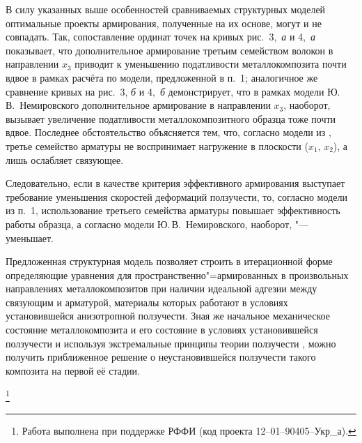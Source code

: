 В силу указанных выше особенностей сравниваемых структурных моделей
оптимальные проекты армирования, полученные на их основе, могут и не
совпадать. Так, сопоставление ординат точек на кривых рис.~3,~{\sl а} и 4,~{\sl а}
показывает, что дополнительное армирование третьим семейством волокон в
направлении $x_3 $ приводит к уменьшению податливости металлокомпозита почти
вдвое в рамках расчёта по модели, предложенной в п.~1; аналогичное же
сравнение кривых на рис.~3, {\sl б} и 4,~{\sl б} демонстрирует, что в рамках модели Ю.\,В.~Немировского
\cite{yank:bib6,yank:bib18} дополнительное армирование в направлении $x_3$,
наоборот, вызывает увеличение податливости металлокомпозитного образца тоже
почти вдвое. Последнее обстоятельство объясняется тем, что, согласно модели
из \cite{yank:bib6,yank:bib18}, третье семейство арматуры не воспринимает нагружение в плоскости
($x_1 ,\,x_2 $), а лишь ослабляет связующее.

Следовательно, если в качестве критерия эффективного армирования выступает
требование уменьшения скоростей деформаций ползучести, то, согласно модели
из п.~1, использование третьего семейства арматуры повышает
эффективность работы образца, а согласно модели Ю.\,В.~Немировского, наоборот,
"--- уменьшает.

\smallskip

 Предложенная структурная модель позволяет строить в
итерационной форме определяющие уравнения для пространственно"=армированных в
произвольных направлениях металлокомпозитов при наличии идеальной адгезии
между связующим и арматурой, материалы которых работают в условиях
установившейся анизотропной ползучести. Зная же начальное механическое
состояние металлокомпозита \cite{yank:bib12} и его состояние в условиях установившейся
ползучести и используя экстремальные принципы теории ползучести \cite{yank:bib8}, можно
получить приближенное решение о неустановившейся ползучести такого композита
на первой её стадии.

\thanks{Работа выполнена при поддержке РФФИ (код проекта 12--01--90405--Укр\_а).}



